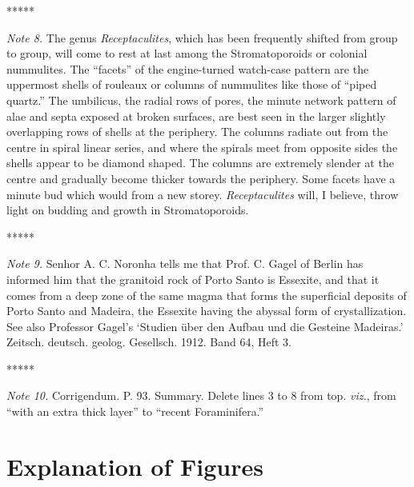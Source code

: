 \documentclass[a4paper, 12pt, oneside]{article}
\begin{document}
\centerline{*\hspace{15mm}*\hspace{15mm}*\hspace{15mm}*\hspace{15mm}*}
\bigskip

\emph{Note 8.} The genus \emph{Receptaculites}, which has been frequently shifted from group to group, will come to rest at last among the Stromatoporoids or colonial nummulites. The ``facets'' of the engine-turned watch-case pattern are the uppermost shells of rouleaux or columns of nummulites like those of ``piped quartz.'' The umbilicus, the radial rows of pores, the minute network pattern of alae and septa exposed at broken surfaces, are best seen in the larger slightly overlapping rows of shells at the periphery. The columns radiate out from the centre in spiral linear series, and where the spirals meet from opposite sides the shells appear to be diamond shaped. The columns are extremely slender at the centre and gradually become thicker towards the periphery. Some facets have a minute bud which would from a new storey. \emph{Receptaculites} will, I believe, throw light on budding and growth in Stromatoporoids.

\centerline{*\hspace{15mm}*\hspace{15mm}*\hspace{15mm}*\hspace{15mm}*}
\bigskip

\emph{Note 9.} Senhor A. C. Noronha tells me that Prof. C. Gagel of Berlin has informed him that the granitoid rock of Porto Santo is Essexite, and that it comes from a deep zone of the same magma that forms the superficial deposits of Porto Santo and Madeira, the Essexite having the abyssal form of crystallization. See also Professor Gagel's `Studien über den Aufbau und die Gesteine Madeiras.' Zeitsch. deutsch. geolog. Gesellsch. 1912. Band 64, Heft 3.

\centerline{*\hspace{15mm}*\hspace{15mm}*\hspace{15mm}*\hspace{15mm}*}
\bigskip

\emph{Note 10.} Corrigendum. P. 93. Summary. Delete lines 3 to 8 from top. \emph{viz.}, from ``with an extra thick layer'' to ``recent Foraminifera.''
\clearpage
\section{Explanation of Figures}
\end{document}

